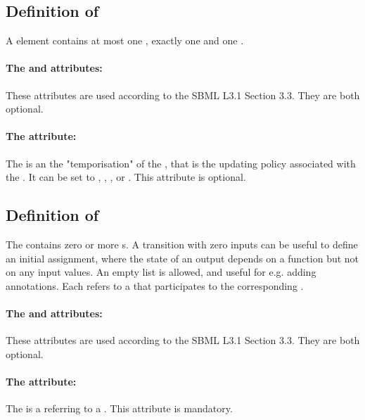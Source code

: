 \bigskip
\subsection*{Definition of  } %

A  element contains at most one , exactly one  and one .

\paragraph{The  and  attributes:}
These attributes are used according to the SBML L3.1 Section 3.3. They are both optional. 

\paragraph{The  attribute:}
The  is an  the "temporisation" of the , that is the updating policy associated with the . It can be set to , , ,  or .
This attribute is optional. 

\bigskip
\subsection*{Definition of } %
The  contains zero or more s. A transition with zero inputs can be useful to define an initial assignment, where the state of an output depends on a function but not on any input values. An empty list is allowed, and useful for e.g. adding annotations.
Each  refers to a  that participates to the corresponding .

\paragraph{The  and  attributes:}
 These attributes are used according to the SBML L3.1 Section 3.3. They are both optional.

\paragraph{The  attribute:}
The  is a  referring to a . This attribute is mandatory.


